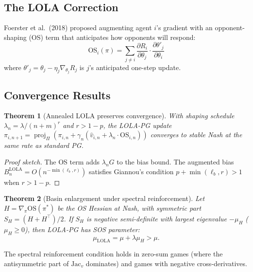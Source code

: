 \documentclass[11pt,a4paper]{article}
\newtheorem{theorem}{Theorem}[section]
\DeclareMathOperator{\proj}{proj}
\begin{document}
\subsection{The LOLA Correction}

Foerster et al.\ (2018) proposed augmenting agent $i$'s gradient with
an opponent-shaping (OS) term that anticipates how opponents will respond:
\begin{equation}\label{eq:lola-term}
    \text{OS}_{i}(\pi) = \sum_{j \neq i} \frac{\partial R_i}{\partial \theta_j}
    \cdot \frac{\partial \theta'_j}{\partial \theta_i}
\end{equation}
where $\theta'_j = \theta_j - \eta_j \nabla_{\theta_j} R_j$ is $j$'s
anticipated one-step update.

\subsection{Convergence Results}

\begin{theorem}[Annealed LOLA preserves convergence]\label{thm:lola-conv}
With shaping schedule $\lambda_n = \lambda/(n+m)^r$ and $r > 1-p$,
the LOLA-PG update
$\pi_{i,n+1} = \proj_\Pi(\pi_{i,n} + \gamma_n(\hat{v}_{i,n} + \lambda_n \cdot \text{OS}_{i,n}))$
converges to stable Nash at the same rate as standard PG.
\end{theorem}

\begin{proof}[Proof sketch]
The OS term adds $\lambda_n G$ to the bias bound. The augmented bias
$B_n^{\text{LOLA}} = O(n^{-\min(\ell_b, r)})$ satisfies Giannou's
condition $p + \min(\ell_b, r) > 1$ when $r > 1-p$.
\end{proof}

\begin{theorem}[Basin enlargement under spectral reinforcement]\label{thm:basin}
Let $H = \nabla_\pi \text{OS}(\pi^*)$ be the OS Hessian at Nash, with
symmetric part $S_H = (H + H^\top)/2$. If $S_H$ is negative semi-definite
with largest eigenvalue $-\mu_H$ ($\mu_H \geq 0$), then LOLA-PG has
SOS parameter:
\begin{equation}
    \mu_{\text{LOLA}} = \mu + \lambda \mu_H > \mu.
\end{equation}
\end{theorem}

The spectral reinforcement condition holds in zero-sum games (where the
antisymmetric part of $\text{Jac}_v$ dominates) and games with negative
cross-derivatives.
\end{document}
